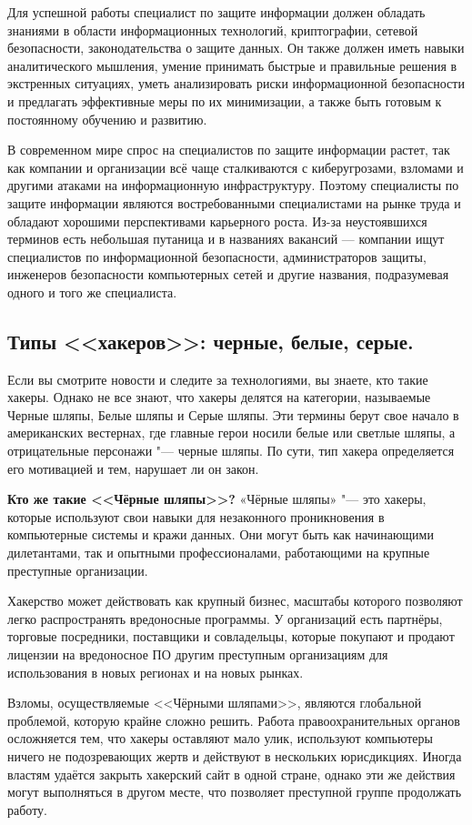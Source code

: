 Для успешной работы специалист по защите информации должен обладать знаниями в области информационных технологий, 
криптографии, сетевой безопасности, законодательства о защите данных. Он также должен иметь навыки аналитического мышления, 
умение принимать быстрые и правильные решения в экстренных ситуациях, уметь анализировать риски информационной безопасности и 
предлагать эффективные меры по их минимизации, а также быть готовым к постоянному обучению и развитию.

В современном мире спрос на специалистов по защите информации растет, так как компании и организации всё чаще сталкиваются с 
киберугрозами, взломами и другими атаками на информационную инфраструктуру. Поэтому специалисты по защите информации являются 
востребованными специалистами на рынке труда и обладают хорошими перспективами карьерного роста.
Из-за неустоявшихся терминов есть небольшая путаница и в названиях вакансий — компании ищут специалистов по информационной 
безопасности, администраторов защиты, инженеров безопасности компьютерных сетей и другие названия, подразумевая одного и того 
же специалиста.
\newpage
\subsection{Типы <<хакеров>>: черные, белые, серые.}
Если вы смотрите новости и следите за технологиями, вы знаете, кто такие хакеры. Однако не все знают, что хакеры делятся на категории, называемые Черные шляпы, Белые шляпы и Серые шляпы. Эти термины берут свое начало в американских вестернах, где главные герои носили белые или светлые шляпы, а отрицательные персонажи "---  черные шляпы.
По сути, тип хакера определяется его мотивацией и тем, нарушает ли он закон.

\textbf{Кто же такие <<Чёрные шляпы>>?}
«Чёрные шляпы» "---  это хакеры, которые используют свои навыки для незаконного проникновения в компьютерные системы и кражи данных. Они могут быть как начинающими дилетантами, так и опытными профессионалами, работающими на крупные преступные организации.

Хакерство может действовать как крупный бизнес, масштабы которого позволяют легко распространять вредоносные программы. У организаций есть партнёры, торговые посредники, поставщики и совладельцы, которые покупают и продают лицензии на вредоносное ПО другим преступным организациям для использования в новых регионах и на новых рынках.

Взломы, осуществляемые <<Чёрными шляпами>>, являются глобальной проблемой, которую крайне сложно решить. Работа 
правоохранительных органов осложняется тем, что хакеры оставляют мало улик, используют компьютеры ничего не подозревающих 
жертв и действуют в нескольких юрисдикциях. Иногда властям удаётся закрыть хакерский сайт в одной стране, однако эти же 
действия могут выполняться в другом месте, что позволяет преступной группе продолжать работу.

